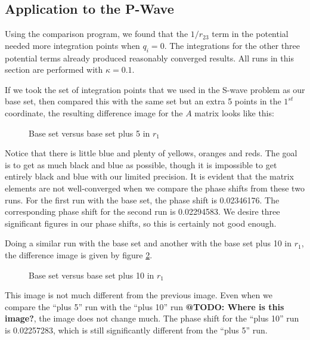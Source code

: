 \documentclass[Dissertation.tex]{subfiles}
\begin{document}
\subsection{Application to the P-Wave}

Using the comparison program, we found that the $1/r_{23}$ term in the potential needed more integration points when $q_i = 0$. The integrations for the other three potential terms already produced reasonably converged results. All runs in this section are performed with $\kappa = 0.1$.

If we took the set of integration points that we used in the S-wave problem as our base set, then compared this with the same set but an extra 5 points in the $1^{st}$ coordinate, the resulting difference image for the $A$ matrix looks like this:
\begin{figure}[H]
	\centering
	\caption{Base set versus base set plus 5 in $r_1$}
	\label{fig:BasevsBaseplus5}
\end{figure}
\noindent Notice that there is little blue and plenty of yellows, oranges and reds. The goal is to get as much black and blue as possible, though it is impossible to get entirely black and blue with our limited precision. It is evident that the matrix elements are not well-converged when we compare the phase shifts from these two runs. For the first run with the base set, the phase shift is 0.02346176. The corresponding phase shift for the second run is 0.02294583. We desire three significant figures in our phase shifts, so this is certainly not good enough.

Doing a similar run with the base set and another with the base set plus 10 in $r_1$, the difference image is given by figure \ref{fig:BasevsBaseplus10}.
\begin{figure}[H]
	\centering
	\caption{Base set versus base set plus 10 in $r_1$}
	\label{fig:BasevsBaseplus10}
\end{figure}
\noindent This image is not much different from the previous image. Even when we compare the ``plus 5'' run with the ``plus 10'' run \textbf{@TODO: Where is this image?}, the image does not change much. The phase shift for the ``plus 10'' run is 0.02257283, which is still significantly different from the ``plus 5'' run.
\end{document}
